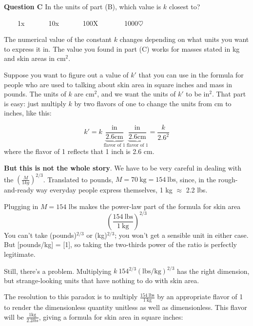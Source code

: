 \documentclass[
  letterpaper,
  DIV=11,
  numbers=noendperiod,
  oneside]{article}
\begin{document}
\begin{multicols}{2}
\textbf{Question C} In the units of part (B), which value is \(k\)
closest to?

~~~~{1{x}}~~~~~~~{10{x}}~~~~~~~{100{︎X
}}~~~~~~~{1000{\(\heartsuit\ \)}}

The numerical value of the constant \(k\) changes depending on what
units you want to express it in. The value you found in part (C) works
for masses stated in kg and skin areas in cm\(^2\).

Suppose you want to figure out a value of \(k'\) that you can use in the
formula for people who are used to talking about skin area in square
inches and mass in pounds. The units of \(k\) are cm\(^2\), and we want
the units of \(k'\) to be in\(^2\). That part is easy: just multiply
\(k\) by two flavors of one to change the units from cm to inches, like
this:

\[k' = k\ \underbrace{\frac{\text{in}}{2.6 \text{cm}}}_\text{flavor of 1}\  \underbrace{\frac{\text{in}}{2.6 \text{cm}}}_\text{flavor of 1} = \frac{k}{2.6^2}\]
where the flavor of 1 reflects that 1 inch is 2.6 cm.

\textbf{But this is not the whole story}. We have to be very careful in
dealing with the \(\left(\frac{M}{1 kg}\right)^{2/3}\). Translated to
pounds, \(M = 70\ \text{kg} = 154\ \text{lbs}\), since, in the
rough-and-ready way everyday people express themselves, 1 kg \(\approx\)
2.2 lbs.

Plugging in \(M=154\) lbs makes the power-law part of the formula for
skin area \[\left(\frac{154\ \text{lbs}}{1\ \text{kg}}\right)^{2/3}\]
You can't take (pounds)\(^{2/3}\) or (kg)\(^{2/3}\); you won't get a
sensible unit in either case. But {[}pounds/kg{]} = {[}1{]}, so taking
the two-thirds power of the ratio is perfectly legitimate.

Still, there's a problem. Multiplying
\(k\ 154^{2/3} (\text{lbs}/\text{kg})^{2/3}\) has the right dimension,
but strange-looking units that have nothing to do with skin area.

The resolution to this paradox is to multiply
\(\frac{154\ \text{lbs}}{1\  \text{kg}}\) by an appropriate flavor of 1
to render the dimensionless quantity unitless as well as dimensionless.
This flavor will be \(\frac{1 \text{kg}}{2.2 lbs}\), giving a formula
for skin area in square inches:


\end{multicols}
\end{document}
